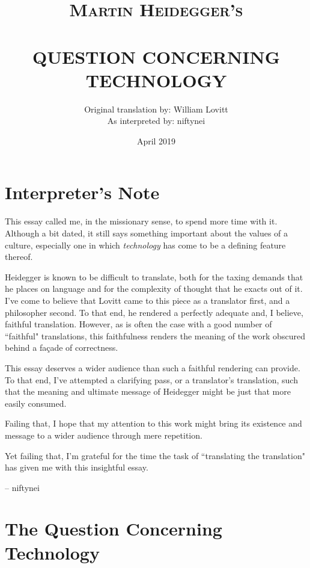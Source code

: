 \documentclass[paper=a4, fontsize=11pt,twoside]{scrartcl}
\title{	\normalsize \textsc{Martin Heidegger's} 
		 	\\[.5cm]								%
			\HRule{0.5pt} \\						%
			\LARGE \textbf{\uppercase{Question Concerning Technology}}	%
			\HRule{2pt} \\ [0.5cm]		%
		}
\author{
		Original translation by: William Lovitt\\	
		As interpreted by: niftynei\\	
}
\date{April 2019}
\makeatletter
\def\printtitle{%
    {\centering \@title\par}}
\def\printauthor{%
    {\centering \large \@author}}
\makeatother
\begin{document}
\thispagestyle{empty}		%

\printtitle					%
  	\vfill
\printauthor				%
\newpage
\setcounter{page}{1}		%
\section*{Interpreter's Note}

\vspace{3.0cm}
This essay called me, in the missionary sense, to spend more time with it. Although a bit dated, it still says something important about the values of a culture, especially one in which \textit{technology} has come to be a defining feature thereof.

Heidegger is known to be difficult to translate, both for the taxing demands that he places on language and for the complexity of thought that he exacts out of it.  I've come to believe that Lovitt came to this piece as a translator first, and a philosopher second. To that end, he rendered a perfectly adequate and, I believe, faithful translation. However, as is often the case with a good number of ``faithful" translations, this faithfulness renders the meaning of the work obscured behind a fa\c{c}ade of correctness.

This essay deserves a wider audience than such a faithful rendering can provide. To that end, I've attempted a clarifying pass, or a translator's translation, such that the meaning and ultimate message of Heidegger might be just that more easily consumed.

Failing that, I hope that my attention to this work might bring its existence and message to a wider audience through mere repetition.

Yet failing that, I'm grateful for the time the task of ``translating the translation" has given me with this insightful essay.

\begin{flushright}
-- niftynei\\
\end{flushright}

\vfill
\section*{The Question Concerning Technology}
\end{document}
